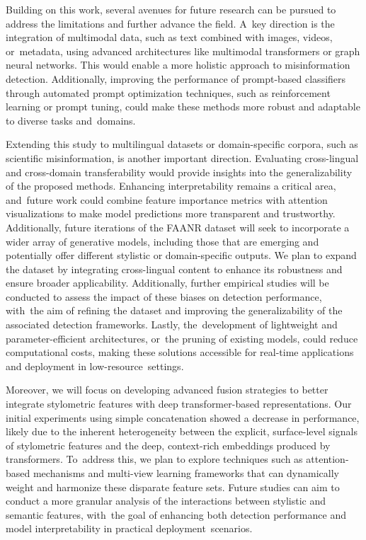 \documentclass[electronics,article,accept,pdftex,moreauthors,electronics]{Definitions/mdpi}
\begin{document}
Building on this work, several avenues for future research can be pursued to address the limitations and further advance the field. A~key direction is the integration of multimodal data, such as text combined with images, videos, or~metadata, using advanced architectures like multimodal transformers or graph neural networks. This would enable a more holistic approach to misinformation detection. Additionally, improving the performance of prompt-based classifiers through automated prompt optimization techniques, such as reinforcement learning or prompt tuning, could make these methods more robust and adaptable to diverse tasks and~domains.

Extending this study to multilingual datasets or domain-specific corpora, such as scientific misinformation, is another important direction. Evaluating cross-lingual and cross-domain transferability would provide insights into the generalizability of the proposed methods. Enhancing interpretability remains a critical area, and~future work could combine feature importance metrics with attention visualizations to make model predictions more transparent and trustworthy. Additionally, future iterations of the FAANR dataset will seek to incorporate a wider array of generative models, including those that are emerging and potentially offer different stylistic or domain-specific outputs. We plan to expand the dataset by integrating cross-lingual content to enhance its robustness and ensure broader applicability. Additionally, further empirical studies will be conducted to assess the impact of these biases on detection performance, with~the aim of refining the dataset and improving the generalizability of the associated detection frameworks. Lastly, the~development of lightweight and parameter-efficient architectures, or~the pruning of existing models, could reduce computational costs, making these solutions accessible for real-time applications and deployment in low-resource~settings.

Moreover, we will focus on developing advanced fusion strategies to better integrate stylometric features with deep transformer-based representations. Our initial experiments using simple concatenation showed a decrease in performance, likely due to the inherent heterogeneity between the explicit, surface-level signals of stylometric features and the deep, context-rich embeddings produced by transformers. To~address this, we plan to explore techniques such as attention-based mechanisms and multi-view learning frameworks that can dynamically weight and harmonize these disparate feature sets. Future studies can aim to conduct a more granular analysis of the interactions between stylistic and semantic features, with~the goal of enhancing both detection performance and model interpretability in practical deployment~scenarios.
\end{document}
